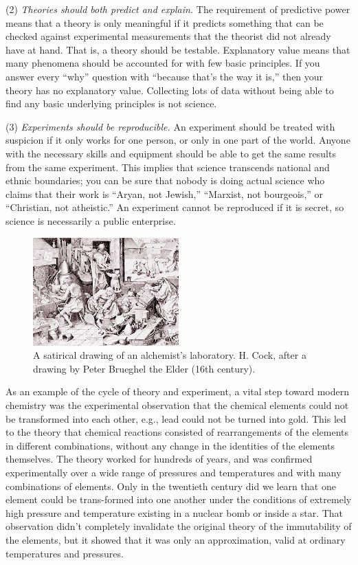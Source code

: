 (2) \emph{Theories should both predict and explain.} The
requirement of predictive power means that a theory is only
meaningful if it predicts something that can be checked
against experimental measurements that the theorist did not
already have at hand. That is, a theory should be testable.
Explanatory value means that many phenomena should be
accounted for with few basic principles. If you answer every
``why'' question with ``because that's the way it is,'' then
your theory has no explanatory value. Collecting lots of
data without being able to find any basic underlying
principles is not science.

(3) \emph{Experiments should be reproducible.} An experiment
should be treated with suspicion if it only works for one
person, or only in one part of the world. Anyone with the
necessary skills and equipment should be able to get the
same results from the same experiment. This implies that
science transcends national and ethnic boundaries; you can
be sure that nobody is doing actual science who claims that
their work is ``Aryan, not Jewish,'' ``Marxist, not
bourgeois,'' or ``Christian, not atheistic.'' An experiment
cannot be reproduced if it is secret, so science is
necessarily a public enterprise.


\begin{figure}[h!]
\begin{center}
  \includegraphics[width=0.5\textwidth]{./introduction/figs/alchemy}
  \caption{A satirical drawing of an alchemist's
      laboratory. H. Cock, after a drawing
      by Peter Brueghel the Elder (16th
      century).}
	  \end{center}
\end{figure}


As an example of the cycle of theory and experiment, a vital
step toward modern chemistry was the experimental observation
that the chemical elements could not be transformed into
each other, e.g., lead could not be turned into gold. This
led to the theory that chemical reactions consisted of
rearrangements of the elements in different combinations,
without any change in the identities of the elements
themselves. The theory worked for hundreds of years, and was
confirmed experimentally over a wide range of pressures and
temperatures and with many combinations of elements. Only in
the twentieth century did we learn that one element could be
trans-formed into one another under the conditions of
extremely high pressure and temperature existing in a
nuclear bomb or inside a star. That observation didn't
completely invalidate the original theory of the immutability
of the elements, but it showed that it was only an
approximation, valid at ordinary temperatures and pressures.


